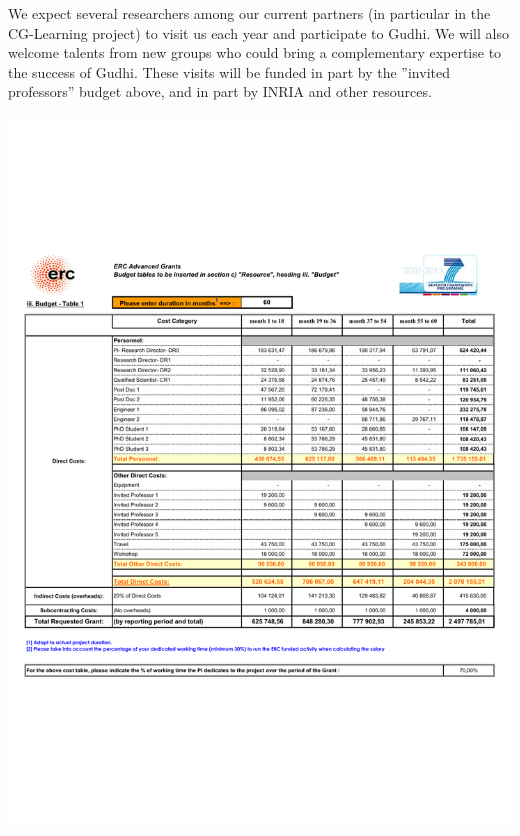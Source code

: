 We expect several researchers among our current partners (in particular in the CG-Learning project) to visit us each year and participate to Gudhi. We will also welcome talents from new groups who could bring a complementary expertise to the success of Gudhi. These visits will be funded in part by the ”invited professors” budget above, and in part by INRIA and other resources.
\vspace{4mm}

\includegraphics[width=\textwidth]{budget2}




{\footnotesize
%


}

